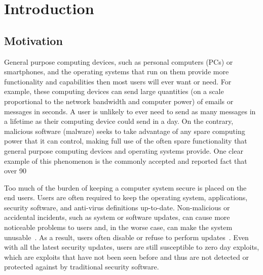 
\chapter{Introduction}

\section{Motivation}

General purpose computing devices, such as personal computers (PCs) or smartphones, and the operating systems that run on them provide more functionality and capabilities then most users will ever want or need. For example, these computing devices can send large quantities (on a scale proportional to the network bandwidth and computer power) of emails or messages in seconds. A user is unlikely to ever need to send as many messages in a lifetime as their computing device could send in a day. On the contrary, malicious software (malware) seeks to take advantage of any spare computing power that it can control, making full use of the often spare functionality that general purpose computing devices and operating systems provide. One clear example of this phenomenon is the commonly accepted and reported fact that over 90%

Too much of the burden of keeping a computer system secure is placed on the end users. Users are often required to keep the operating system, applications, security software, and anti-virus definitions up-to-date. Non-malicious or accidental incidents, such as system or software updates, can cause more noticeable problems to users and, in the worse case, can make the system unusable~\cite{MSRC_XP_blue_screen_2010, Krebs_2010, Tech_World_2005, Japan_Times_2005}. As a result, users often disable or refuse to perform updates~\cite{The_Register_2009, Microsoft_TechNet_2010, MS_SIR_2009}. Even with all the latest security updates, users are still susceptible to zero day exploits, which are exploits that have not been seen before and thus are not detected or protected against by traditional security software. 

